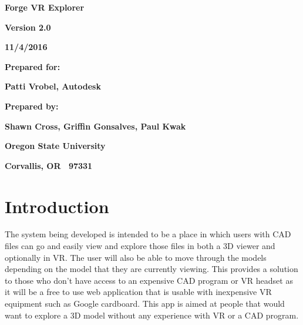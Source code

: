 \documentclass[letterpaper, 10pt, draftclsnofoot, compsoc, onecolumn]{IEEEtran}
\begin{document}
\bigskip

{\centering{}\bfseries\color{black}
Forge VR Explorer
\par}

\bigskip
\bigskip
\bigskip

\begin{figure}
\centering
\end{figure}

\bigskip
\bigskip

{\centering{}\bfseries\color{black}
Version 2.0
\par}

{\centering{}\bfseries\color{black}
11/4/2016
\par}


\bigskip
\bigskip

{\centering{}\bfseries\color{black}
Prepared for:
\par}

{\centering{}\bfseries\color{black}
Patti Vrobel, Autodesk
\par}


\bigskip
\bigskip

{\centering{}\bfseries\color{black}
Prepared by:  
\par}

{\centering{}\bfseries\color{black}
Shawn Cross, Griffin Gonsalves, Paul Kwak
\par}

{\centering{}\bfseries\color{black}
Oregon State University
\par}

{\centering{}\bfseries\color{black}
Corvallis, OR \ 97331
\par}


\clearpage

\section{Introduction}
	The system being developed is intended to be a place in which users with CAD files can go and easily view and explore those files in both a 3D viewer and optionally in VR. The user will also be able to move through the models depending on the model that they are currently viewing. This provides a solution to those who don't have access to an expensive CAD program or VR headset as it will be a free to use web application that is usable with inexpensive VR equipment such as Google cardboard. This app is aimed at people that would want to explore a 3D model without any experience with VR or a CAD program.
 
\end{document}

